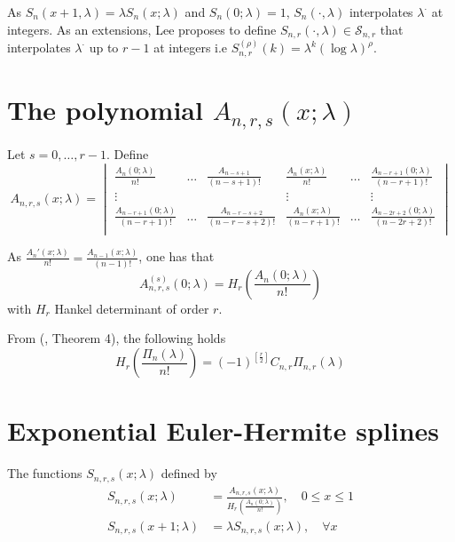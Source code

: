 \documentclass[a4paper, 11pt]{article}
\begin{document}
As $S_n(x+1, \lambda) = \lambda S_n(x;\lambda)$ and $S_n(0;\lambda) = 1$, $S_n(\cdot, \lambda)$ interpolates 
$\lambda^{\cdot}$ at integers. As an extensions, Lee proposes to define $S_{n,r}(\cdot, \lambda) \in \mathcal{S}_{n,r}$ 
that interpolates $\lambda^{\cdot}$ up to $r-1$ at integers i.e $S_{n,r}^{(\rho)}(k) = \lambda^k {(\log 
\lambda)}^{\rho}$.

\section{The polynomial $A_{n,r,s}(x;\lambda)$}

Let $s=0, \ldots, r-1$. Define
\begin{equation}
  A_{n,r,s}(x;\lambda) = \begin{vmatrix}
    \frac{A_n(0;\lambda)}{n!} & \hdots & \frac{A_{n-s+1}}{(n-s+1)!} & \frac{A_n(x;\lambda)}{n!} & \hdots & 
    \frac{A_{n-r+1}(0;\lambda)}{(n-r+1)!} \\
    \vdots & & & \vdots & & \vdots \\
    \frac{A_{n-r+1}(0;\lambda)}{(n-r+1)!} & \hdots & \frac{A_{n-r-s+2}}{(n-r-s+2)!} & \frac{A_n(x;\lambda)}{(n-r+1)!} & 
    \hdots & \frac{A_{n-2r+2}(0;\lambda)}{(n-2r+2)!} \\
  \end{vmatrix}
\end{equation}

As $\frac{A_n'(x;\lambda)}{n!} = \frac{A_{n-1}(x;\lambda)}{(n-1)!}$, one has that 
\begin{equation*}
  A^{(s)}_{n,r,s}(0; \lambda) = H_r(\frac{A_n(0;\lambda)}{n!})
\end{equation*}
with $H_r$ Hankel determinant of order $r$.

From (\cite{LS76}, Theorem 4), the following holds
\begin{equation*}
  H_r(\frac{\Pi_n(\lambda)}{n!}) = {(-1)}^{[\frac{r}{2}]} C_{n,r} \Pi_{n,r}(\lambda)
\end{equation*}

\section{Exponential Euler-Hermite splines}

The functions $S_{n,r,s}(x;\lambda)$ defined by 
\begin{align*}
  S_{n,r,s}(x;\lambda) &= \frac{A_{n,r,s}(x; \lambda)}{H_r(\frac{A_n(0;\lambda)}{n!})}, \quad 0 \leq x \leq 1 \\
  S_{n,r,s}(x+1;\lambda) &= \lambda S_{n,r,s}(x;\lambda), \quad \forall x
\end{align*}
\end{document}
